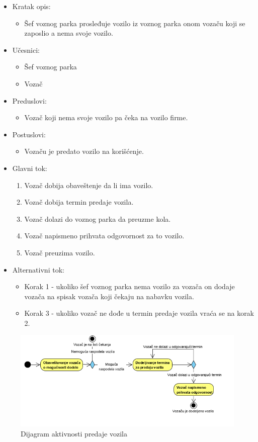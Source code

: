 \begin{itemize}
	\item Kratak opis:
		\begin{itemize}
			\item Šef voznog parka prosleđuje vozilo iz voznog parka onom vozaču koji se zaposlio a nema svoje vozilo.
		\end{itemize}
	\item Učesnici:
		\begin{itemize}
		    \item Šef voznog parka
			\item Vozač
		\end{itemize}
	\item Preduslovi:
		\begin{itemize}
		    \item Vozač koji nema svoje vozilo pa čeka na vozilo firme.
		\end{itemize}
	\item Postuslovi:
		\begin{itemize}
			\item Vozaču je predato vozilo na korišćenje.
	\end{itemize}
	\item Glavni tok:
		\begin{enumerate}
		    \item Vozač dobija obaveštenje da li ima vozilo.
		    \item Vozač dobija termin predaje vozila.
		    \item Vozač dolazi do voznog parka da preuzme kola.
			\item Vozač napismeno prihvata odgovornost za to vozilo.
			\item Vozač preuzima vozilo.
		\end{enumerate}
	\item Alternativni tok:
		\begin{itemize}
		    \item Korak 1 - ukoliko šef voznog parka nema vozilo za vozača on dodaje vozača na spisak vozača koji čekaju na nabavku vozila.
		    \item Korak 3 - ukoliko vozač ne dođe u termin predaje vozila vraća se na korak 2.
		\end{itemize}
\end{itemize}

\begin{figure}[H]
\begin{left}
\includegraphics[scale=1]{Slike/PredajaVozila.png}
\end{left}
    \caption{Dijagram aktivnosti predaje vozila}
\label{fig:PredajaVozila}
\end{figure}

